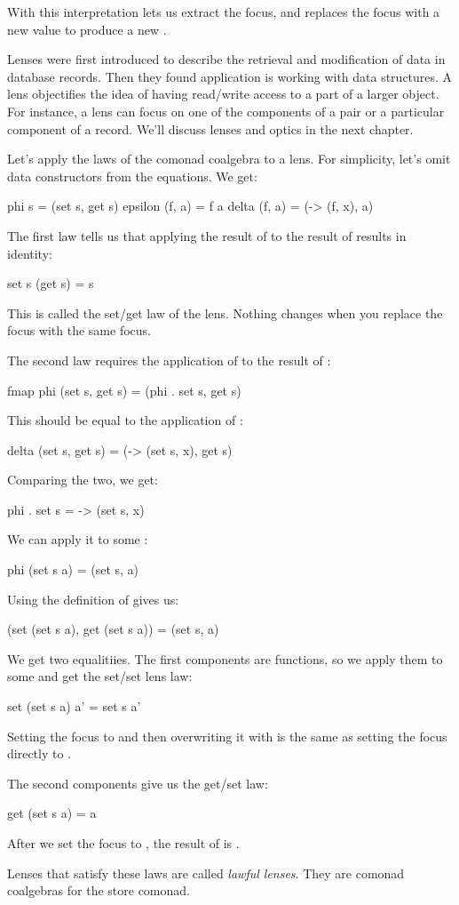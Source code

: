 \documentclass[DaoFP]{subfiles}
\begin{document}
With this interpretation  lets us extract the focus, and  replaces the focus with a new value to produce a new . 

Lenses were first introduced to describe the retrieval and modification of data in database records. Then they found application is working with data structures. A lens objectifies the idea of having read/write access to a part of a larger object. For instance, a lens can focus on one of the components of a pair or a particular component of a record. We'll discuss lenses and optics in the next chapter.

Let's apply the laws of the comonad coalgebra to a lens. For simplicity, let's omit data constructors from the equations. We get:
\begin{haskell}
phi s = (set s, get s)
epsilon (f, a) = f a
delta (f, a) = (\x -> (f, x), a)
\end{haskell}

The first law  tells us that applying the result of  to the result of  results in identity:
\begin{haskell}
set s (get  s) = s
\end{haskell}
This is called the set/get law of the lens. Nothing changes when you replace the focus with the same focus.

The second law requires the application of  to the result of :
\begin{haskell}
fmap phi (set s, get s) = (phi . set s, get s)
\end{haskell}
This should be equal to the application of :
\begin{haskell}
delta (set s, get s) = (\x -> (set s, x), get s)
\end{haskell}
Comparing the two, we get:
\begin{haskell}
phi . set s = \x -> (set s, x)
\end{haskell}
We can apply it to some :
\begin{haskell}
phi (set s a) = (set s, a)
\end{haskell}
Using the definition of  gives us:
\begin{haskell}
(set (set s a), get (set s a)) = (set s, a)
\end{haskell}
We get two equalitiies. The first components are functions, so we apply them to some  and get the set/set lens law:
\begin{haskell}
set (set s a) a' = set s a'
\end{haskell}
Setting the focus to  and then overwriting it with  is the same as setting the focus directly to .

The second components give us the get/set law:
\begin{haskell}
get (set s a) = a
\end{haskell}
After we set the focus to , the result of  is .

Lenses that satisfy these laws are called \emph{lawful lenses}. They are comonad coalgebras for the store comonad.
\end{document}
